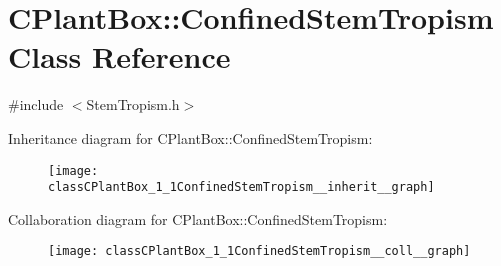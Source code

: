 \hypertarget{classCPlantBox_1_1ConfinedStemTropism}{}\section{C\+Plant\+Box\+:\+:Confined\+Stem\+Tropism Class Reference}
\label{classCPlantBox_1_1ConfinedStemTropism}


{\ttfamily \#include $<$Stem\+Tropism.\+h$>$}



Inheritance diagram for C\+Plant\+Box\+:\+:Confined\+Stem\+Tropism\+:\nopagebreak
\begin{figure}[H]
\begin{center}
\leavevmode
\texttt{[image: classCPlantBox\_1\_1ConfinedStemTropism\_\_inherit\_\_graph]}
\end{center}
\end{figure}


Collaboration diagram for C\+Plant\+Box\+:\+:Confined\+Stem\+Tropism\+:\nopagebreak
\begin{figure}[H]
\begin{center}
\leavevmode
\texttt{[image: classCPlantBox\_1\_1ConfinedStemTropism\_\_coll\_\_graph]}
\end{center}
\end{figure}
